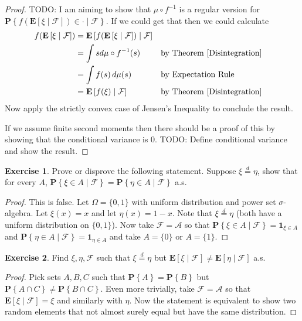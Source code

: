 \documentclass{amsbook}
\theoremstyle{definition}
\newtheorem{xca}{Exercise}
\theoremstyle{remark}
\newcommand{\cexpectationlong}[2]{\textbf{E}\left[ #2 \mid #1 \right]}
\newcommand{\probability}[1]{\textbf{P}\left \{#1 \right \}}
\newcommand{\cprobability}[2]{\textbf{P} \left \{#2 \mid #1 \right \}}
\newcommand{\characteristic}[1]{\textbf{1}_{#1}}
\newcommand{\pushforward}[2]{#2 \circ #1^{-1}}
\newcommand{\eqdist}{\overset{d}=}
\begin{document}
\begin{proof}
TODO: I am aiming to show that $\pushforward{f}{\mu}$ is a regular version
for
$\cprobability{\mathcal{F}}{f(\cexpectationlong{\mathcal{F}}{\xi}) \in
\cdot}$.
If we could get that then we could calculate
\begin{align*}
f(\cexpectationlong{\mathcal{F}}{\xi}) &=
\cexpectationlong{\mathcal{F}}
{f(\cexpectationlong{\mathcal{F}}{\xi})} \\
&= \int s d \pushforward{f}{\mu} (s) & & \text{by Theorem \ref{Disintegration}}\\
&= \int f(s) \, d\mu(s)  & & \text{by Expectation Rule} \\
&= \cexpectationlong{\mathcal{F}}{f(\xi)} & & \text{by Theorem \ref{Disintegration}}
\end{align*}
Now apply the strictly convex case of Jensen's Inequality to conclude
the result.

If we assume finite second moments then there should be a proof of
this by showing that the conditional variance is $0$.  TODO: Define
conditional variance and show the result.
\end{proof}

\begin{xca}Prove or disprove the following statement.  Suppose $\xi \eqdist \eta$, show that for every $A$, 
  $\cprobability{\mathcal{F}}{\xi \in A} =
  \cprobability{\mathcal{F}}{\eta \in A}$ a.s.
\end{xca}
\begin{proof}
This is false.  Let $\Omega = \lbrace 0,1 \rbrace$ with uniform distribution and
power set $\sigma$-algebra.  Let
$\xi(x) = x$ and let $\eta(x) = 1 - x$.  Note that $\xi \eqdist
\eta$ (both have a uniform distribution on $\lbrace 0,1 \rbrace$). Now take $\mathcal{F} = \mathcal{A}$ so that
$\cprobability{\mathcal{F}}{\xi \in A} = \characteristic{\xi \in A}$
and $\cprobability{\mathcal{F}}{\eta \in A} = \characteristic{\eta \in
  A}$ and take $A = \lbrace 0 \rbrace$ or $A = \lbrace 1 \rbrace$.
\end{proof}

\begin{xca}Find $\xi, \eta, \mathcal{F}$ such that $\xi \eqdist \eta$
  but $\cexpectationlong{\mathcal{F}}{\xi} \neq
  \cexpectationlong{\mathcal{F}}{\eta}$ a.s.
\end{xca}
\begin{proof}
Pick sets $A,B,C$ such that $\probability{A} = \probability{B}$ but
$\probability{A \cap C} \neq \probability{B \cap C}$.  Even more
trivially, take $\mathcal{F} = \mathcal{A}$ so that
$\cexpectationlong{\mathcal{F}}{\xi} = \xi$ and similarly with
$\eta$.  Now the statement is equivalent to show two random elements
that not almost surely equal but have the same distribution.
\end{proof}
\end{document}
